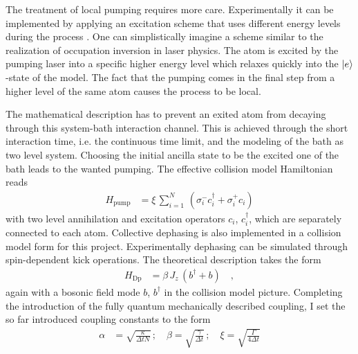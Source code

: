 The treatment of local pumping requires more care. %
Experimentally it can be implemented by applying an excitation scheme that uses different energy levels during the process \cite{meiser_prospects_2009}. One can simplistically imagine a scheme similar to the realization of occupation inversion in laser physics. The atom is excited by the pumping laser into a specific higher energy level which relaxes quickly into the $\ket{e}$-state of the model. The fact that the pumping comes in the final step from a higher level of the same atom causes the process to be local.

The mathematical description has to prevent an exited atom from decaying through this system-bath interaction channel. This is achieved through the short interaction time, i.e. the continuous time limit, and the modeling of the bath as two level system. Choosing the initial ancilla state to be the excited one of the bath leads to the wanted pumping. The effective collision model Hamiltonian reads 
\begin{align*}
    H_\text{pump}&=\xi\,\sum_{i=1}^N\,(\sigma_i^-c_i^\dagger+\sigma_i^+c_i)
\end{align*}
with two level annihilation and excitation operators $c_i$, $c_i^\dagger$, which are separately connected to each atom. Collective dephasing is also implemented in a collision model form for this project. %
Experimentally dephasing can be simulated through spin-dependent kick operations\cite{sun_quantum_2024}. The theoretical description takes the form %
\begin{align*}
    H_\text{Dp}&=\beta\,J_z\,(b^\dagger+b)\quad,
\end{align*}
again with a bosonic field mode $b$, $b^\dagger$ in the collision model picture. Completing the introduction of the fully quantum mechanically described coupling, I set the so far introduced coupling constants to the form
\begin{align}
    \alpha&=\sqrt{\frac{\kappa}{\Delta tN}}\,;\quad \beta=\sqrt{\frac{\gamma}{\Delta t}}\,;\quad \xi=\sqrt{\frac{\Gamma}{4\Delta t}}
\end{align}
